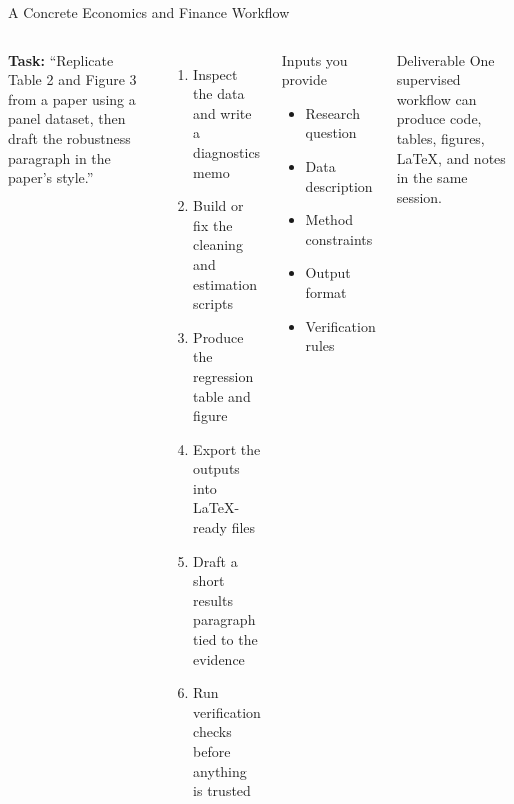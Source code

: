 \documentclass[aspectratio=169,10pt]{beamer}
\begin{document}
\begin{frame}{A Concrete Economics and Finance Workflow}
\small
\begin{columns}[T]
\textbf{Task:} ``Replicate Table 2 and Figure 3 from a paper using a panel dataset,
then draft the robustness paragraph in the paper's style.''

\vspace{0.5em}
\begin{enumerate}\itemsep2pt
    \item Inspect the data and write a diagnostics memo
    \item Build or fix the cleaning and estimation scripts
    \item Produce the regression table and figure
    \item Export the outputs into LaTeX-ready files
    \item Draft a short results paragraph tied to the evidence
    \item Run verification checks before anything is trusted
\end{enumerate}

\begin{block}{Inputs you provide}
\begin{itemize}\itemsep2pt
    \item Research question
    \item Data description
    \item Method constraints
    \item Output format
    \item Verification rules
\end{itemize}
\end{block}

\begin{alertblock}{Deliverable}
One supervised workflow can produce code, tables, figures, LaTeX, and notes in the same session.
\end{alertblock}
\end{columns}
\end{frame}
\end{document}
